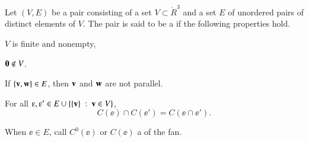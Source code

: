 \begin{definition}  
Let $(V,E)$ be a pair consisting of a set $V\subset \ring{R}^3$ and
a set $E$ of unordered pairs of distinct elements of $V$.  The pair
is said to be a  if the following properties hold.
\begin{nomerate}
\item {} $V$ is finite and  nonempty,
\item {} ${\mathbf 0}\not\in V$.
\item {} If $\{{\mathbf v},{\mathbf w}\} \in E$, then ${\mathbf v}$ and ${\mathbf w}$
are not parallel.
\item {}
For all $\ee ,\ee '\in E \cup \{\{\v\}\mid \v\in V\}$, 
\begin{displaymath}C(\ee )\cap C(\ee ') = C(\ee \cap \ee
').\end{displaymath}
\end{nomerate}
When $\ee\in E$, call $C^0(\ee)$ or $C(\ee)$ a 
of the fan.
\end{definition}
%
%
%
%
%
%
\bigskip\hbox{~}\bigskip



